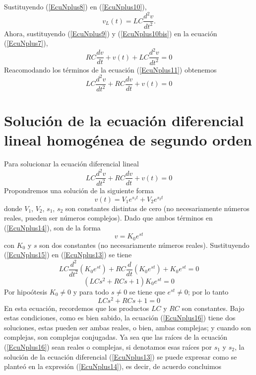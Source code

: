 \documentclass{article}
\begin{document}
Sustituyendo (\ref{EcuNplus8}) en (\ref{EcuNplus10}),
\begin{equation}
 v_{L}(t)=LC\frac{d^{2}v}{dt^{2}}.
 \label{EcuNplus10bis}
\end{equation}
Ahora, sustituyendo (\ref{EcuNplus9}) y (\ref{EcuNplus10bis}) en la ecuaci\'{o}n (\ref{EcuNplus7}),
\begin{equation}
 RC\frac{dv}{dt}+v(t)+LC\frac{d^{2}v}{dt^{2}}=0
 \label{EcuNplus11}
\end{equation}
Reacomodando los t\'{e}rminos de la ecuaci\'{o}n (\ref{EcuNplus11}) obtenemos
\begin{equation}
 LC\frac{d^{2}v}{dt^{2}}+RC\frac{dv}{dt}+v(t)=0
\label{EcuNplus12}
 \end{equation}
\section{Soluci\'{o}n de la ecuaci\'{o}n diferencial lineal homog\'{e}nea de segundo orden}
Para solucionar la ecuaci\'{o}n diferencial lineal
\begin{equation}
 LC\frac{d^{2}v}{dt^{2}}+RC\frac{dv}{dt}+v(t)=0
 \label{EcuNplus13}
\end{equation}
Propondremos una soluci\'{o}n de la siguiente forma
\begin{equation}
 v(t)=V_{1}e^{s_{1}t}+V_{2}e^{s_{2}t}
 \label{EcuNplus14}
\end{equation}
donde $V_{1}$, $V_{2}$, $s_{1}$, $s_{2}$ son constantes distintas de cero (no necesariamente n\'{u}meros reales, pueden ser n\'{u}meros complejos). Dado que ambos t\'{e}rminos en (\ref{EcuNplus14}), son de la forma
\begin{equation}
 v=K_{0}e^{st}
 \label{EcuNplus15}
\end{equation}
con $K_{0}$ y $s$ son dos constantes (no necesariamente n\'{u}meros reales). 
Sustituyendo (\ref{EcuNplus15}) en 
(\ref{EcuNplus13}) se tiene
\begin{equation}
LC\frac{d^{2}}{dt^{2}}\left(K_{0}e^{st}
\right)+RC\frac{d}{dt}\left(K_{0}e^{st}
\right)+K_{0}e^{st}=0 
\end{equation}
\begin{equation}
 \left(LCs^{2}+RCs+1\right)K_{0}e^{st}=0
\end{equation}
Por hipo\'{o}tesis $K_{0}\neq 0$ y para todo $s\neq 0$ se tiene que $e^{st}\neq 0$; por lo tanto
\begin{equation}
 LCs^{2}+RCs+1=0
 \label{EcuNplus16}
\end{equation}
En esta ecuaci\'{o}n, recordemos que los productos $LC$ y $RC$ son constantes. Bajo estas condiciones, como es bien sabido, la ecuaci\'{o}n (\ref{EcuNplus16}) tiene dos soluciones, estas pueden ser ambas reales, o bien, ambas complejas; y cuando son complejas, son complejas conjugadas. Ya sea que las ra\'{i}ces de la ecuaci\'{o}n (\ref{EcuNplus16}) sean reales o complejas, si denotamos esas ra\'{i}ces por $s_{1}$ y $s_{2}$, la soluci\'{o}n de la ecuaci\'{o}n diferencial (\ref{EcuNplus13}) se puede expresar como se plante\'{o} en la expresi\'{o}n (\ref{EcuNplus14}), es decir, de acuerdo concluimos
\end{document}
